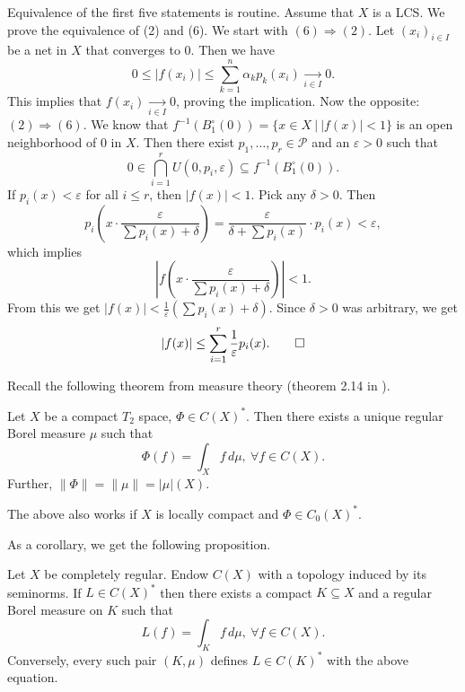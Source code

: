 \begin{myproof}
  Equivalence of the first five statements is routine.
  Assume that $X$ is a LCS. We prove the equivalence of (2) and (6).
  We start with $(6) \Rightarrow (2)$. Let $(x_i)_{i \in I}$ be a net in $X$ that converges to $0$.
  Then we have 
  $$0 \leq |f(x_i)| \leq \sum_{k = 1} ^n \alpha_k p_k(x_i) \xrightarrow[i \in I]{} 0.$$
  This implies that $f(x_i) \xrightarrow[i \in I]{} 0$, proving the implication.
  Now the opposite: $(2) \Rightarrow (6)$.
  We know that $f^{-1} ( B_1 ^\circ (0)) = \{x \in X\ |\ |f(x)| < 1\}$
  is an open neighborhood of $0$ in $X$. Then there exist $p_1, \dots, p_r \in \mathcal{P}$
  and an $\varepsilon > 0$ such that 
  $$0 \in \bigcap_{i = 1} ^r U(0, p_i, \varepsilon) \subseteq f^{-1} (B_1 ^\circ (0)).$$
  If $p_i(x) < \varepsilon$ for all $i \leq r$, then $|f(x)| < 1.$ Pick any $\delta > 0$.
  Then $$p_i \left(x \cdot \frac{\varepsilon}{\sum p_i (x) + \delta}\right) = \frac{\varepsilon}{\delta + \sum p_i (x)} \cdot p_i (x) < \varepsilon,$$
  which implies 
  $$\left| f\left(x \cdot \frac{\varepsilon}{\sum p_i (x) + \delta}\right) \right| < 1.$$
  From this we get 
  $|f(x)| < \frac{1}{\varepsilon} \left(\sum p_i (x) + \delta\right)$.
  Since $\delta > 0$ was arbitrary, we get
  \begin{equation*}
    |f(x)| \leq \sum_{i = 1} ^r \frac{1}{\varepsilon} p_i(x). \qedhere 
  \end{equation*}
\end{myproof}

Recall the following theorem from measure theory (theorem 2.14 in \cite{rudin}).

\begin{theorem}
  Let $X$ be a compact $T_2$ space, $\Phi \in C(X)^*$.
  Then there exists a unique regular Borel measure $\mu$ such that 
  $$\Phi (f) = \int_X f\, d\mu,\ \forall f \in C(X).$$
  Further, $\| \Phi\| = \|\mu\| = |\mu| (X)$.
\end{theorem}

\begin{remark}
  The above also works if $X$ is locally compact and $\Phi \in C_0(X)^*$.
\end{remark}

As a corollary, we get the following proposition.

\begin{proposition}
  Let $X$ be completely regular. Endow $C(X)$ with a topology induced by its seminorms.
  If $L \in C(X)^{*}$ then there exists a compact $K \subseteq X$ and a regular Borel measure on $K$ such that 
  $$L(f) = \int_{K} f\, d\mu,\ \forall f \in C(X).$$
  Conversely, every such pair $(K, \mu)$ defines $L \in C(K)^*$ with the above equation.
\end{proposition}

